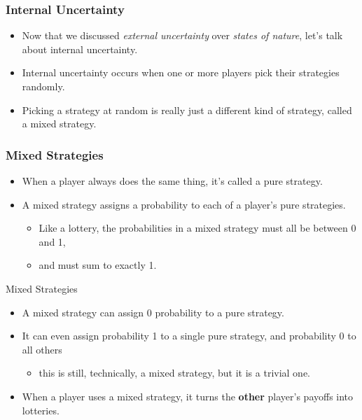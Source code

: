 
\begin{frame}
\frametitle{Internal Uncertainty}
\begin{itemize}
  
  \item Now that we discussed \textit{external uncertainty} over \textit{states of nature},
  let's talk about \alert{internal uncertainty}.

	\item Internal uncertainty occurs when one or more players pick their strategies randomly.

	\item Picking a strategy at random is really just a different kind of strategy, called a \alert{mixed strategy}.
\end{itemize}
\end{frame}


\begin{frame}
\frametitle{Mixed Strategies}
\begin{itemize}

	\item When a player always does the same thing, it's called a \alert{pure strategy}.
  
  \item A \alert{mixed strategy} assigns a probability to each of a player's pure strategies. 

  \begin{itemize}
    \item Like a lottery, the probabilities in a mixed strategy must all be between 0 and 1,
    \item and must sum to exactly 1.
  \end{itemize}
\end{itemize}
\end{frame}


\begin{frame}{Mixed Strategies}

\begin{itemize}

  \item A mixed strategy can assign 0 probability to a pure strategy.

  \item It can even assign probability 1 to a single pure strategy, and probability 0 to all others
  
  \begin{itemize}
    \item this is still, technically, a mixed strategy, but it is a trivial one.
  \end{itemize}

	\item When a player uses a mixed strategy, it turns the \textbf{other} player's payoffs into lotteries.
  
\end{itemize}
\end{frame}

